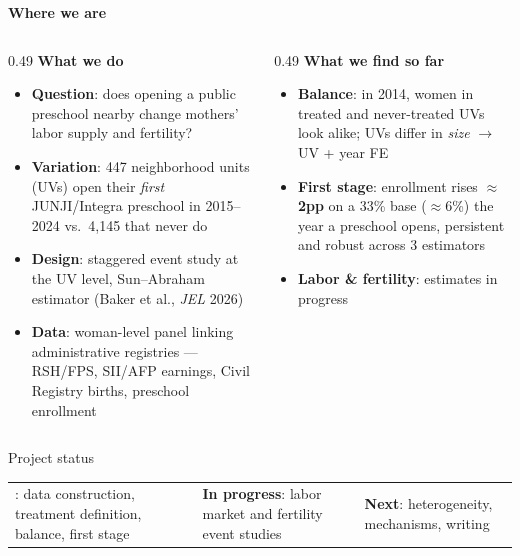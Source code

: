\documentclass[aspectratio=169,10pt]{beamer}
\begin{document}
\begin{frame}
\vspace{4pt}
{\large\bfseries\color{navy} Where we are}
\vspace{8pt}

\begin{columns}[T]
\begin{column}{0.49\textwidth}
{\small\textcolor{steel}{\textbf{What we do}}}
\begin{itemize}
  \footnotesize
  \item \textbf{Question}: does opening a public preschool nearby change mothers' labor supply and fertility?
  \item \textbf{Variation}: 447 neighborhood units (UVs) open their \emph{first} JUNJI/Integra preschool in 2015--2024 vs.\ 4{,}145 that never do
  \item \textbf{Design}: staggered event study at the UV level, Sun--Abraham estimator (Baker et al., \emph{JEL} 2026)
  \item \textbf{Data}: woman-level panel linking administrative registries --- RSH/FPS, SII/AFP earnings, Civil Registry births, preschool enrollment
\end{itemize}
\end{column}
\begin{column}{0.49\textwidth}
{\small\textcolor{steel}{\textbf{What we find so far}}}
\begin{itemize}
  \footnotesize
  \item \textbf{Balance}: in 2014, women in treated and never-treated UVs look alike; UVs differ in \emph{size} $\to$ UV + year FE
  \item \textbf{First stage}: enrollment rises $\approx$\textbf{2pp} on a 33\% base ($\approx$6\%) the year a preschool opens, persistent and robust across 3 estimators
  \item \textbf{Labor \& fertility}: estimates in progress
\end{itemize}
\end{column}
\end{columns}

\vspace{10pt}
\begin{block}{Project status}
\footnotesize
\begin{tabular}{@{}>{\raggedright\arraybackslash}p{}>{\raggedright\arraybackslash}p{}>{\raggedright\arraybackslash}p{}@{}}
{\color{statuslisto}\textbf{Done}}: data construction, treatment definition, balance, first stage &
{\color{statuspink}\textbf{In progress}}: labor market and fertility event studies &
{\color{statusred}\textbf{Next}}: heterogeneity, mechanisms, writing
\end{tabular}
\end{block}
\end{frame}
\end{document}
